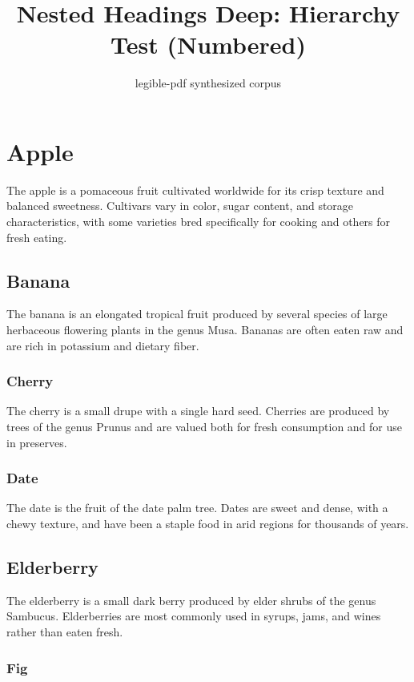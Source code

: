 \documentclass[12pt]{article}
\title{Nested Headings Deep: Hierarchy Test (Numbered)}
\author{legible-pdf synthesized corpus}
\date{}
\begin{document}
\maketitle

\section{Apple}

The apple is a pomaceous fruit cultivated worldwide for its crisp texture
and balanced sweetness. Cultivars vary in color, sugar content, and storage
characteristics, with some varieties bred specifically for cooking and
others for fresh eating.

\subsection{Banana}

The banana is an elongated tropical fruit produced by several species of
large herbaceous flowering plants in the genus Musa. Bananas are often eaten
raw and are rich in potassium and dietary fiber.

\subsubsection{Cherry}

The cherry is a small drupe with a single hard seed. Cherries are produced
by trees of the genus Prunus and are valued both for fresh consumption and
for use in preserves.

\subsubsection{Date}

The date is the fruit of the date palm tree. Dates are sweet and dense, with
a chewy texture, and have been a staple food in arid regions for thousands
of years.

\subsection{Elderberry}

The elderberry is a small dark berry produced by elder shrubs of the genus
Sambucus. Elderberries are most commonly used in syrups, jams, and wines
rather than eaten fresh.

\subsubsection{Fig}
\end{document}
